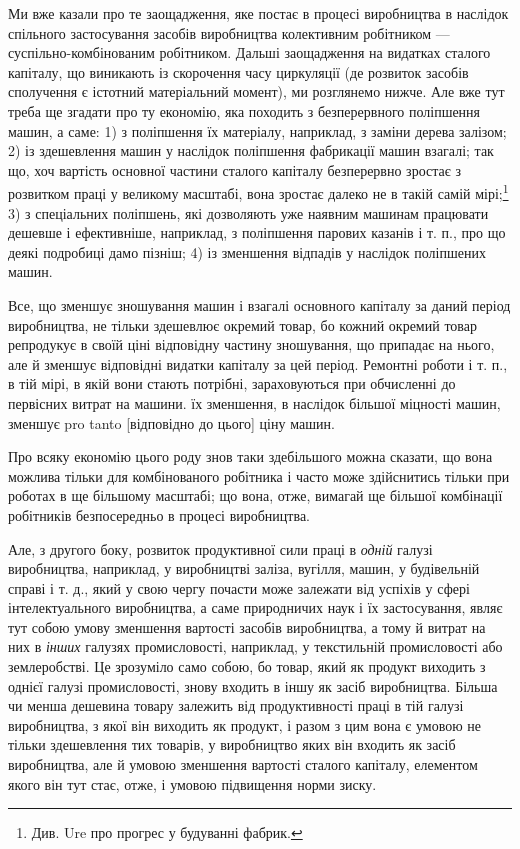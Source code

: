 Ми вже казали про те заощадження, яке постає в процесі
виробництва в наслідок спільного застосування засобів виробництва
колективним робітником — суспільно-комбінованим робітником.
Дальші заощадження на видатках сталого капіталу, що
виникають із скорочення часу циркуляції (де розвиток засобів
сполучення є істотний матеріальний момент), ми розглянемо
нижче. Але вже тут треба ще згадати про ту економію, яка
походить з безперервного поліпшення машин, а саме: 1) з поліпшення
їх матеріалу, наприклад, з заміни дерева залізом; 2) із
здешевлення машин у наслідок поліпшення фабрикації машин
взагалі; так що, хоч вартість основної частини сталого капіталу
безперервно зростає з розвитком праці у великому масштабі,
вона зростає далеко не в такій самій мірі;\footnote{
Див. Ure про прогрес у будуванні фабрик.
} 3) з спеціальних поліпшень,
які дозволяють уже наявним машинам працювати дешевше
і ефективніше, наприклад, з поліпшення парових казанів
і т. п., про що деякі подробиці дамо пізніш; 4) із зменшення
відпадів у наслідок поліпшених машин.

Все, що зменшує зношування машин і взагалі основного капіталу
за даний період виробництва, не тільки здешевлює окремий
товар, бо кожний окремий товар репродукує в своїй ціні
відповідну частину зношування, що припадає на нього, але
й зменшує відповідні видатки капіталу за цей період. Ремонтні
роботи і т. п., в тій мірі, в якій вони стають потрібні, зараховуються
при обчисленні до первісних витрат на машини. їх зменшення,
в наслідок більшої міцності машин, зменшує pro tanto
[відповідно до цього] ціну машин.

Про всяку економію цього роду знов таки здебільшого можна
сказати, що вона можлива тільки для комбінованого робітника
і часто може здійснитись тільки при роботах в ще більшому
масштабі; що вона, отже, вимагай ще більшої комбінації робітників
безпосередньо в процесі виробництва.

Але, з другого боку, розвиток продуктивної сили праці
в \emph{одній} галузі виробництва, наприклад, у виробництві заліза,
вугілля, машин, у будівельній справі і т. д., який у свою чергу
почасти може залежати від успіхів у сфері інтелектуального
виробництва, а саме природничих наук і їх застосування, являє
тут собою умову зменшення вартості засобів виробництва, а тому
й витрат на них в \emph{інших} галузях промисловості, наприклад,
у текстильній промисловості або землеробстві. Це зрозуміло
само собою, бо товар, який як продукт виходить з однієї галузі
промисловості, знову входить в іншу як засіб виробництва.
Більша чи менша дешевина товару залежить від продуктивності
праці в тій галузі виробництва, з якої він виходить як продукт,
і разом з цим вона є умовою не тільки здешевлення тих товарів,
у виробництво яких він входить як засіб виробництва, але
й умовою зменшення вартості сталого капіталу, елементом якого
він тут стає, отже, і умовою підвищення норми зиску.

